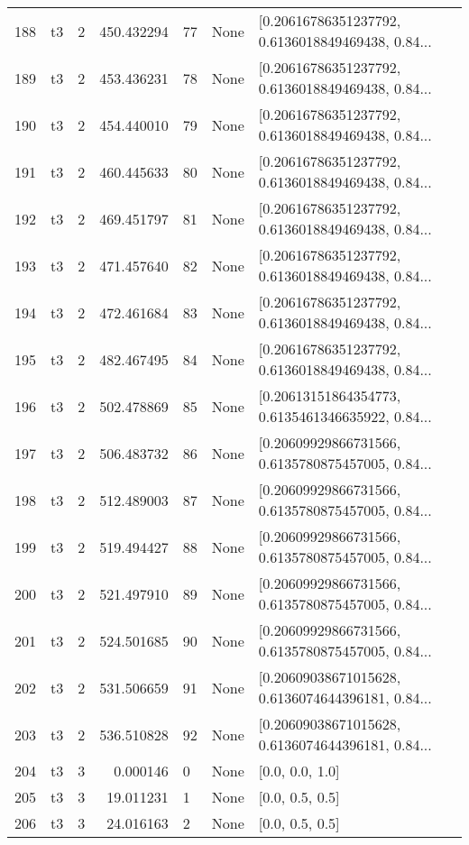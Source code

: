 \begin{tabular}{lllrlll}
188 &  t3 &   2 &  450.432294 &   77 &  None &  [0.20616786351237792, 0.6136018849469438, 0.84... \\
189 &  t3 &   2 &  453.436231 &   78 &  None &  [0.20616786351237792, 0.6136018849469438, 0.84... \\
190 &  t3 &   2 &  454.440010 &   79 &  None &  [0.20616786351237792, 0.6136018849469438, 0.84... \\
191 &  t3 &   2 &  460.445633 &   80 &  None &  [0.20616786351237792, 0.6136018849469438, 0.84... \\
192 &  t3 &   2 &  469.451797 &   81 &  None &  [0.20616786351237792, 0.6136018849469438, 0.84... \\
193 &  t3 &   2 &  471.457640 &   82 &  None &  [0.20616786351237792, 0.6136018849469438, 0.84... \\
194 &  t3 &   2 &  472.461684 &   83 &  None &  [0.20616786351237792, 0.6136018849469438, 0.84... \\
195 &  t3 &   2 &  482.467495 &   84 &  None &  [0.20616786351237792, 0.6136018849469438, 0.84... \\
196 &  t3 &   2 &  502.478869 &   85 &  None &  [0.20613151864354773, 0.6135461346635922, 0.84... \\
197 &  t3 &   2 &  506.483732 &   86 &  None &  [0.20609929866731566, 0.6135780875457005, 0.84... \\
198 &  t3 &   2 &  512.489003 &   87 &  None &  [0.20609929866731566, 0.6135780875457005, 0.84... \\
199 &  t3 &   2 &  519.494427 &   88 &  None &  [0.20609929866731566, 0.6135780875457005, 0.84... \\
200 &  t3 &   2 &  521.497910 &   89 &  None &  [0.20609929866731566, 0.6135780875457005, 0.84... \\
201 &  t3 &   2 &  524.501685 &   90 &  None &  [0.20609929866731566, 0.6135780875457005, 0.84... \\
202 &  t3 &   2 &  531.506659 &   91 &  None &  [0.20609038671015628, 0.6136074644396181, 0.84... \\
203 &  t3 &   2 &  536.510828 &   92 &  None &  [0.20609038671015628, 0.6136074644396181, 0.84... \\
204 &  t3 &   3 &    0.000146 &    0 &  None &                                    [0.0, 0.0, 1.0] \\
205 &  t3 &   3 &   19.011231 &    1 &  None &                                    [0.0, 0.5, 0.5] \\
206 &  t3 &   3 &   24.016163 &    2 &  None &                                    [0.0, 0.5, 0.5] \\

\end{tabular}
